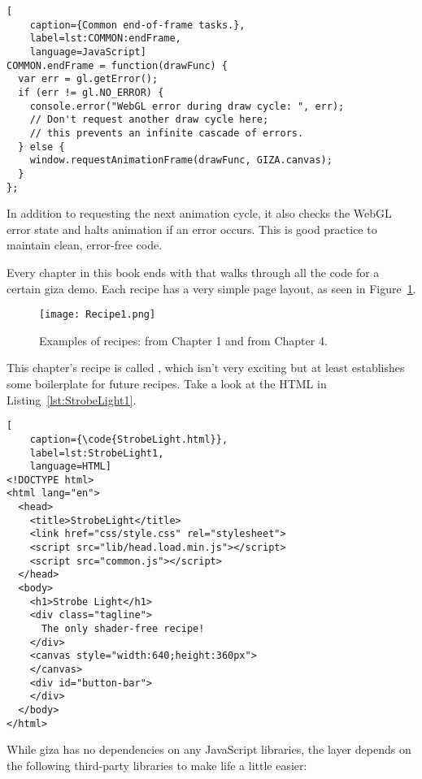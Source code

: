 \begin{lstlisting}[
    caption={Common end-of-frame tasks.},
    label=lst:COMMON:endFrame,
    language=JavaScript]
COMMON.endFrame = function(drawFunc) {
  var err = gl.getError();
  if (err != gl.NO_ERROR) {
    console.error("WebGL error during draw cycle: ", err);
    // Don't request another draw cycle here;
    // this prevents an infinite cascade of errors.
  } else {
    window.requestAnimationFrame(drawFunc, GIZA.canvas);
  }
};
\end{lstlisting} 

In addition to requesting the next animation cycle, it also checks the WebGL error state and halts animation if an error occurs.  This is good practice to maintain clean, error-free code.  


Every chapter in this book ends with  that walks through all the code for a certain giza demo.  Each recipe has a very simple page layout, as seen in Figure~\ref{fig:Recipe1}.

\begin{figure}[htb]\centering
  \texttt{[image: Recipe1.png]}
  \caption{Examples of recipes:  from Chapter 1 and  from Chapter 4.}
  \label{fig:Recipe1}
\end{figure}

This chapter's recipe is called , which isn't very exciting but at least establishes some boilerplate for future recipes.  Take a look at the HTML in Listing~\ref{lst:StrobeLight1}.

\begin{lstlisting}[
    caption={\code{StrobeLight.html}},
    label=lst:StrobeLight1,
    language=HTML]
<!DOCTYPE html>
<html lang="en">
  <head>
    <title>StrobeLight</title>
    <link href="css/style.css" rel="stylesheet">
    <script src="lib/head.load.min.js"></script>
    <script src="common.js"></script>
  </head>
  <body>
    <h1>Strobe Light</h1>
    <div class="tagline">
      The only shader-free recipe!
    </div>
    <canvas style="width:640;height:360px">
    </canvas>
    <div id="button-bar">
    </div>
  </body>
</html>
\end{lstlisting} 

While giza has no dependencies on any JavaScript libraries, the  layer depends on the following third-party libraries to make life a little easier:

